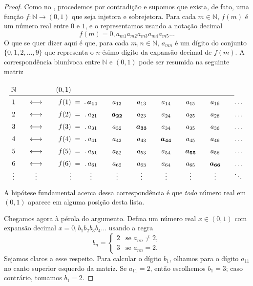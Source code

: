 \begin{proof}
Como no , procedemos por contradição e supomos que exista, de fato, uma função $f \colon \mathbb{N} \to (0, 1)$ que seja injetora e sobrejetora. Para cada $m \in \mathbb{N}$, $f(m)$ é um número real entre $0$ e $1$, e o representamos usando a notação decimal
\[
f(m) = 0{,}a_{m1} a_{m2} a_{m3} a_{m4} a_{m5} \dots
\]
O que se quer dizer aqui é que, para cada $m, n \in \mathbb{N}$, $a_{mn}$ é um 
dígito do conjunto $\{0, 1, 2, \dots, 9\}$ que 
representa o $n$-ésimo dígito da expansão decimal de $f(m)$. 
A correspondência biunívoca entre $\mathbb{N}$ e $(0, 1)$ pode ser 
resumida na seguinte matriz 

\[
\renewcommand{\arraystretch}{1.5}%
\setlength{\arraycolsep}{0.3em}%
\begin{array}{c@{\qquad}c@{\qquad}r@{\;\;}c@{\;\;}*{6}{c@{\qquad}}c}
\mathbb{N} & & (0,1) \\
\cline{1-10}
1 & \longleftrightarrow & f(1) & = & .\,\boldsymbol{a_{11}} & a_{12} & a_{13} & a_{14} & a_{15} & a_{16} & \dots \\
2 & \longleftrightarrow & f(2) & = & .\,a_{21} & \boldsymbol{a_{22}} & a_{23} & a_{24} & a_{25} & a_{26} & \dots \\
3 & \longleftrightarrow & f(3) & = & .\,a_{31} & a_{32} & \boldsymbol{a_{33}} & a_{34} & a_{35} & a_{36} & \dots \\
4 & \longleftrightarrow & f(4) & = & .\,a_{41} & a_{42} & a_{43} & \boldsymbol{a_{44}} & a_{45} & a_{46} & \dots \\
5 & \longleftrightarrow & f(5) & = & .\,a_{51} & a_{52} & a_{53} & a_{54} & \boldsymbol{a_{55}} & a_{56} & \dots \\
6 & \longleftrightarrow & f(6) & = & .\,a_{61} & a_{62} & a_{63} & a_{64} & a_{65} & \boldsymbol{a_{66}} & \dots \\
\vdots & \vdots & \vdots & & \vdots & \vdots & \vdots & \vdots & \vdots & \vdots & \ddots
\end{array}
\]
A hipótese fundamental acerca dessa correspondência é que \textit{todo} número real em $(0, 1)$ aparece 
em alguma posição desta lista.

Chegamos agora à pérola do argumento. Defina um número real $x \in (0, 1)$ com expansão decimal $x = 0{,}b_{1} b_{2} b_{3} b_{4} \dots$ usando a regra 
\[
b_{n} = \begin{cases} 2 & \text{se } a_{nn} \neq 2, \\ 3 & \text{se } a_{nn} = 2. \end{cases}
\]
Sejamos claros a esse respeito. Para calcular o dígito $b_{1}$, olhamos para o dígito $a_{11}$ no canto superior esquerdo da matriz. Se $a_{11} = 2$, então escolhemos $b_{1} = 3$; caso contrário, tomamos $b_{1} = 2$.


\end{proof}
